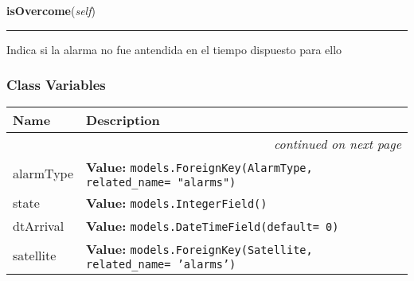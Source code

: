     \label{GroundSegment:models:Alarms:Alarm:Alarm:isOvercome}

    \vspace{0.5ex}

\hspace{.8\funcindent}\begin{boxedminipage}{\funcwidth}

    \raggedright \textbf{isOvercome}(\textit{self})

    \vspace{-1.5ex}

    \rule{\textwidth}{0.5\fboxrule}
\setlength{\parskip}{2ex}
    Indica si la alarma no fue antendida en el tiempo dispuesto para ello

\setlength{\parskip}{1ex}
    \end{boxedminipage}



  \subsubsection{Class Variables}

    \vspace{-1cm}
\hspace{\varindent}\begin{longtable}{|p{\varnamewidth}|p{\vardescrwidth}|l}
\cline{1-2}
\cline{1-2} \centering \textbf{Name} & \centering \textbf{Description}& \\
\cline{1-2}
\endhead\cline{1-2}\multicolumn{3}{r}{\small\textit{continued on next page}}\\\endfoot\cline{1-2}
\endlastfoot\raggedright a\-l\-a\-r\-m\-T\-y\-p\-e\- & \raggedright \textbf{Value:} 
{\tt models.ForeignKey(AlarmType, related\_name= "alarms")}&\\
\cline{1-2}
\raggedright s\-t\-a\-t\-e\- & \raggedright \textbf{Value:} 
{\tt models.IntegerField()}&\\
\cline{1-2}
\raggedright d\-t\-A\-r\-r\-i\-v\-a\-l\- & \raggedright \textbf{Value:} 
{\tt models.DateTimeField(default= 0)}&\\
\cline{1-2}
\raggedright s\-a\-t\-e\-l\-l\-i\-t\-e\- & \raggedright \textbf{Value:} 
{\tt models.ForeignKey(Satellite, related\_name= 'alarms')}&\\
\cline{1-2}
\end{longtable}

